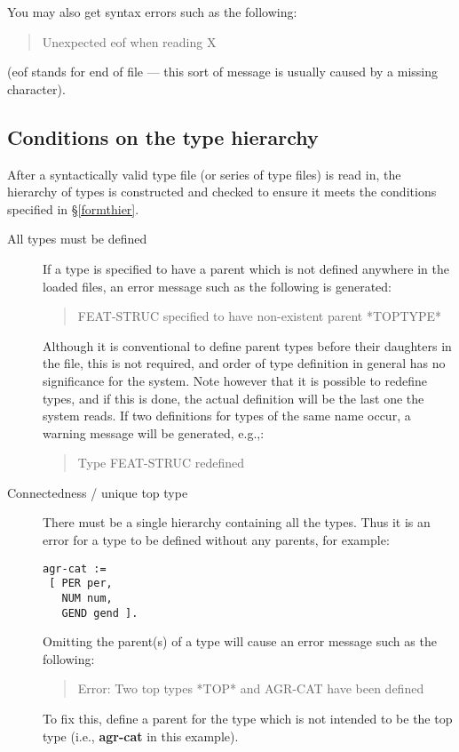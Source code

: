 \documentclass[12pt]{report}
\newenvironment{error}%
{\begin{quote}
\tt
}%
{\end{quote}
}
\newenvironment{warning}%
{\begin{quote}
\tt
}%
{\end{quote}
}
\begin{document}
You may also get syntax errors such as the following:
\begin{error}
Unexpected eof when reading X
\end{error}
(eof stands for end of file --- this sort of message is usually 
caused by a missing character).

\subsection{Conditions on the type hierarchy}
After a syntactically valid type file (or series of type files)
is read in, the hierarchy of types is constructed and checked 
to ensure it meets the conditions specified in \S\ref{formthier}.

\label{typehcond}
\begin{description}
\item[All types must be defined]
If a type is specified to have a parent which is not defined anywhere in the
loaded files, an error message such as the following is generated:
\begin{error}
FEAT-STRUC specified to have non-existent parent *TOPTYPE*
\end{error}
Although it is conventional to define parent types before their 
daughters in the file, this is not required, and order of type definition
in general has no significance for the system.
Note however that it is possible to redefine types, and if this is done, the
actual definition will be the last one the system reads.
If two definitions for types of the same name occur,
a warning message will be generated, e.g.,:
\begin{warning}
Type FEAT-STRUC redefined
\end{warning}
\item[Connectedness / unique top type]
There must be a single hierarchy containing all the types.
Thus it is an error for a type to be defined without any parents,
for example:
\begin{verbatim}
agr-cat := 
 [ PER per,
   NUM num,
   GEND gend ]. 
\end{verbatim}
Omitting the parent(s) of a type will cause an error message such as
the following:
\begin{error}
Error: Two top types *TOP* and AGR-CAT have been defined
\end{error}
To fix this, define a parent for the type which is not intended to be
the top type (i.e., {\bf agr-cat} in this example).


\end{description}
\end{document}
